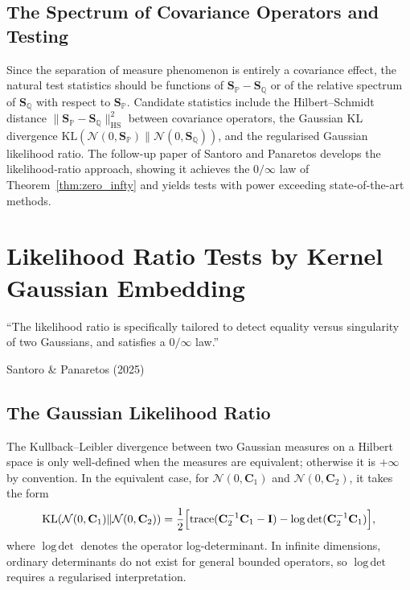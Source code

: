\documentclass[12pt, oneside]{book}
\theoremstyle{plain}
\theoremstyle{definition}
\newcommand{\calN}{\mathcal{N}}
\newcommand{\PP}{\mathbb{P}}
\newcommand{\QQ}{\mathbb{Q}}
\newcommand{\HS}{\mathrm{HS}}
\newcommand{\SP}{\mathbf{S}_{\PP}}
\newcommand{\SQ}{\mathbf{S}_{\QQ}}
\newcommand{\KL}{\mathrm{KL}}
\DeclareMathOperator{\trace}{trace}
\DeclareMathOperator{\logdet}{log\,det}
\begin{document}
\section{The Spectrum of Covariance Operators and Testing}

Since the separation of measure phenomenon is entirely a covariance effect, the natural test statistics should be functions of $\SP - \SQ$ or of the relative spectrum of $\SQ$ with respect to $\SP$. Candidate statistics include the Hilbert--Schmidt distance $\|\SP - \SQ\|_{\HS}^2$ between covariance operators, the Gaussian KL divergence $\KL(\calN(0, \SP) \| \calN(0, \SQ))$, and the regularised Gaussian likelihood ratio.
The follow-up paper of Santoro and Panaretos \cite{SantoroPanaretos2025} develops the likelihood-ratio approach, showing it achieves the $0/\infty$ law of Theorem~\ref{thm:zero_infty} and yields tests with power exceeding state-of-the-art methods.

\chapter{Likelihood Ratio Tests by Kernel Gaussian Embedding}
\label{chap:lrt}

\epigraph{``The likelihood ratio is specifically tailored to detect equality versus
singularity of two Gaussians, and satisfies a $0/\infty$ law.''}%
{Santoro \& Panaretos (2025)}

\section{The Gaussian Likelihood Ratio}

The Kullback--Leibler divergence between two Gaussian measures on a Hilbert space is only well-defined when the measures are equivalent; otherwise it is $+\infty$ by convention. In the equivalent case, for $\calN(0, \mathbf{C}_1)$ and $\calN(0, \mathbf{C}_2)$, it takes the form
\begin{equation}
\KL(\calN(0, \mathbf{C}_1) \| \calN(0, \mathbf{C}_2)) = \frac{1}{2}\Bigl[\trace(\mathbf{C}_2^{-1}\mathbf{C}_1 - \mathbf{I}) - \logdet(\mathbf{C}_2^{-1}\mathbf{C}_1)\Bigr],
\label{eq:gauss_kl}
\end{equation}
where $\logdet$ denotes the operator log-determinant. In infinite dimensions, ordinary determinants do not exist for general bounded operators, so $\logdet$ requires a regularised interpretation.
\end{document}
